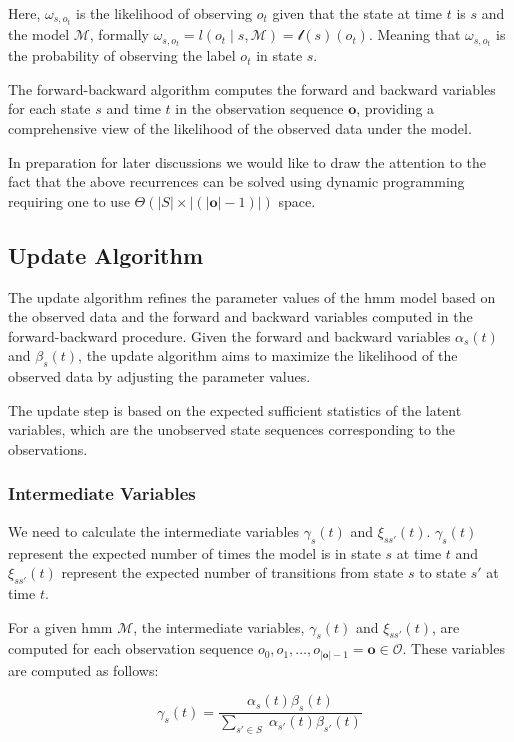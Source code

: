 Here, $\omega_{s, o_t}$ is the likelihood of observing $o_t$ given that the state at time $t$ is $s$ and the model $\mathcal{M}$, formally $\omega_{s, o_t} = l(o_t \mid s, \mathcal{M}) = \mathscr{l}(s)(o_t)$.
Meaning that $\omega_{s, o_t}$ is the probability of observing the label $o_t$ in state $s$.

The forward-backward algorithm computes the forward and backward variables for each state $s$ and time $t$ in the observation sequence $\mathbf{o}$, providing a comprehensive view of the likelihood of the observed data under the model.

In preparation for later discussions we would like to draw the attention to the fact that the above recurrences can be solved using dynamic programming requiring one to use $\Theta(|S|\times|(|\mathbf{o}|-1)|)$ space.

\subsection{Update Algorithm}\label{subsec:update-algorithm}
The update algorithm refines the parameter values of the \gls{hmm} model based on the observed data and the forward and backward variables computed in the forward-backward procedure.
Given the forward and backward variables $\alpha_s(t)$ and $\beta_s(t)$, the update algorithm aims to maximize the likelihood of the observed data by adjusting the parameter values.

The update step is based on the expected sufficient statistics of the latent variables, which are the unobserved state sequences corresponding to the observations.

\subsubsection{Intermediate Variables}
We need to calculate the intermediate variables $\gamma_s(t)$ and $\xi_{ss'}(t)$.
$\gamma_s(t)$ represent the expected number of times the model is in state $s$ at time $t$ and $\xi_{ss'}(t)$ represent the expected number of transitions from state $s$ to state $s'$ at time $t$.

For a given \gls{hmm} $\mathcal{M}$, the intermediate variables, $\gamma_s(t)$ and $\xi_{ss'}(t)$, are computed for each observation sequence $o_0, o_1, \dots, o_{|\mathbf{o}|-1} = \mathbf{o} \in \mathcal{O}$.
These variables are computed as follows:

\begin{equation}
    \gamma_s(t) = \frac{\alpha_s(t) \beta_s(t)}{\sum_{s' \in S} \;\alpha_{s'}(t) \beta_{s'}(t)}
    \label{eq:gamma}
\end{equation}

